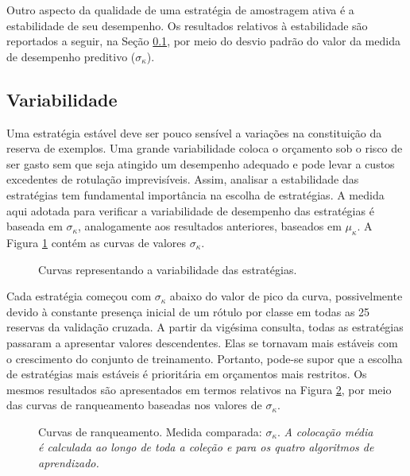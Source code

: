 Outro aspecto da qualidade de uma estratégia de amostragem ativa é a estabilidade de seu desempenho.
Os resultados relativos à estabilidade são reportados a seguir, na Seção \ref{variab}, por meio do desvio padrão do valor da medida de desempenho preditivo ($\sigma_{\kappa}$).

\subsection{Variabilidade}\label{variab}
Uma estratégia estável deve ser pouco sensível a variações na constituição da reserva de exemplos.
Uma grande variabilidade coloca o orçamento sob o risco de ser gasto sem que seja atingido um desempenho adequado e pode levar a custos excedentes de rotulação imprevisíveis.
Assim, analisar a estabilidade das estratégias tem fundamental importância na escolha de estratégias.
A medida aqui adotada para verificar a variabilidade de desempenho das estratégias é baseada em $\sigma_{\kappa}$, analogamente aos resultados anteriores, baseados em $\mu_{\kappa}$.
A Figura \ref{curvasrisco} contém as curvas de valores $\sigma_{\kappa}$.
\begin{figure}
	\centering
	
	\caption{Curvas representando a variabilidade das estratégias.}
	\label{curvasrisco}
\end{figure}

Cada estratégia começou com $\sigma_{\kappa}$ abaixo do valor de pico da curva, possivelmente devido à constante presença inicial de um rótulo por classe em todas as 25 reservas da validação cruzada.
A partir da vigésima consulta, todas as estratégias passaram a apresentar valores descendentes.
Elas se tornavam mais estáveis com o crescimento do conjunto de treinamento.
Portanto, pode-se supor que a escolha de estratégias mais estáveis é prioritária em orçamentos mais restritos.
Os mesmos resultados são apresentados em termos relativos na Figura \ref{curvasrankrisco}, por meio das curvas de ranqueamento baseadas nos valores de $\sigma_{\kappa}$.
\begin{figure}
	\centering
	
	\caption[Curvas de ranqueamento ($\sigma_{\kappa}$).]{Curvas de ranqueamento. Medida comparada: $\sigma_{\kappa}$. \textit{A colocação média é calculada ao longo de toda a coleção e para os quatro algoritmos de aprendizado.}}
	\label{curvasrankrisco}
\end{figure}

